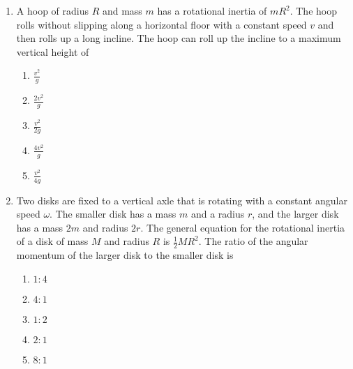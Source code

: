 \documentclass{../../../oss-classkick}
\begin{document}
\begin{multicols*}{2}
\begin{enumerate}[leftmargin=18pt]
  \item A hoop of radius $R$ and mass $m$ has a rotational inertia of $mR^2$.
    The hoop rolls without slipping along a horizontal floor with a constant
    speed $v$ and then rolls up a long incline. The hoop can roll up the
    incline to a maximum vertical height of
    \begin{center}
    \end{center}
    \begin{enumerate}[nosep,leftmargin=18pt,label=(\Alph*)]
    \item$\displaystyle\frac{v^2}{g}$
    \item$\displaystyle\frac{2v^2}{g}$
    \item$\displaystyle\frac{v^2}{2g}$
    \item$\displaystyle\frac{4v^2}{g}$
    \item$\displaystyle\frac{v^2}{4g}$
    \end{enumerate}
    
  \item Two disks are fixed to a vertical axle that is rotating with a constant
    angular speed $\omega$. The smaller disk has a mass $m$ and a radius $r$,
    and the larger disk has a mass $2m$ and radius $2r$. The general equation
    for the rotational inertia of a disk of mass $M$ and radius $R$ is
    $\frac12MR^2$. The ratio of the angular momentum of the larger disk to
    the smaller disk is
    \begin{center}
    \end{center}
    \begin{enumerate}[noitemsep,topsep=0pt,leftmargin=18pt,label=(\Alph*)]
    \item$1:4$
    \item$4:1$
    \item$1:2$
    \item$2:1$
    \item$8:1$
    \end{enumerate}
    \columnbreak
    

\end{enumerate}
\end{multicols*}
\end{document}
